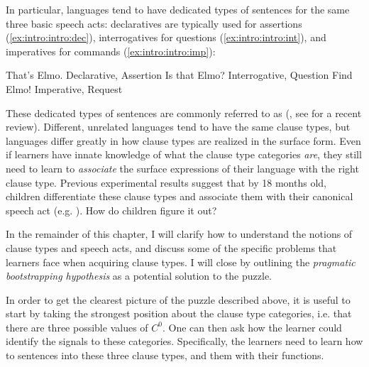 {In particular, languages tend to have dedicated types of sentences for the same three basic speech acts: declaratives are typically used for assertions (\ref{ex:intro:intro:dec}), interrogatives for questions (\ref{ex:intro:intro:int}), and imperatives for commands (\ref{ex:intro:intro:imp}):

\bxl \label{ex:intro:intro:dec}
That's Elmo. \hfill Declarative, Assertion
\ex\label{ex:intro:intro:int} Is that Elmo? \hfill Interrogative, Question
\ex\label{ex:intro:intro:imp} Find Elmo! \hfill Imperative, Request
\exl
\eex


These dedicated types of sentences are commonly referred to as  (\citealt{sz1985speechact, konig2007, aikhenvald2016, portner2018}, see \cite{konig2020} for a recent review). Different, unrelated languages tend to have the same clause types, but languages differ greatly in how clause types are realized in the surface form. Even if learners have innate knowledge of what the clause type categories \emph{are}, they still need to learn to \emph{associate} the surface expressions of their language with the right clause type. Previous experimental results suggest that by 18 months old, children differentiate these clause types and associate them with their canonical speech act (e.g. \cite{casillas2017turn,marshmallowqueen}). How do children figure it out? %

In the remainder of this chapter, I will clarify how to understand the notions of clause types and speech acts, and discuss some of the specific problems that learners face when acquiring clause types. I will close by outlining the \emph{pragmatic bootstrapping hypothesis} as a potential solution to the puzzle.

In order to get the clearest picture of the puzzle described above, it is useful to start by taking the strongest position about the clause type categories, i.e. that there are three possible values of $C^{0}$. One can then ask how the learner could identify the signals to these categories. Specifically, the learners need to learn how to  sentences into these three clause types, and  them with their functions. 


}
